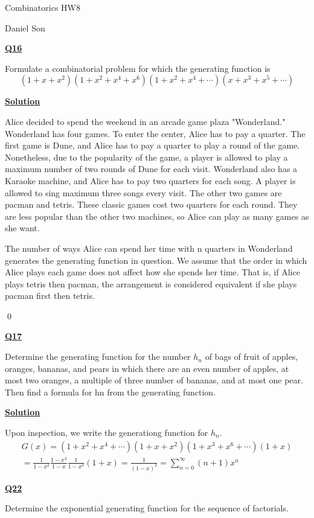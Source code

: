 \documentclass{article}
\newcommand{\new}[1]{
    \vspace{2mm}
    \noindent
    \textbf{
    \underline{#1}}
}
\begin{document}
\begin{center}
\LARGE
Combinatorics HW8

\Large
Daniel Son
\end{center}

\normalsize 

\new{Q16}
Formulate a combinatorial problem for which the generating function is 
\[
    (1 + x + x^2)(1 + x^2 + x^4 + x^6) 
    (1 + x^2 + x^4 + \cdots) (x + x^3 + x^5 + \cdots)
\]
\new{Solution} 
Alice decided to spend the weekend in an arcade game plaza "Wonderland."
Wonderland has four games. To enter the center, Alice has to pay 
a quarter. The first game is Dune, and Alice 
has to pay a quarter to play a round of the game. Nonetheless, 
due to the popularity of the game, a player is allowed to play 
a maximum number of two rounds of Dune for each visit. Wonderland 
also has a Karaoke machine, and Alice has to pay two quarters 
for each song. A player is allowed to sing maximum three songs 
every visit. The other two games are pacman and tetris. These classic 
games cost two quarters for each round. They are less popular than 
the other two machines, so Alice can play as many games as she want. 

The number of ways Alice can spend her time with n quarters in 
Wonderland generates the generating function in question. We assume 
that the order in which Alice plays each game does not affect 
how she spends her time. That is, if Alice plays tetris then pacman, 
the arrangement is considered equivalent if she plays pacman first 
then tetris.

\hfill \qed

\new{Q17}
Determine the generating function for the number $h_n$ of bags of fruit of apples, 
oranges, bananas, and pears in which there are an even number of apples, at 
most two oranges, a multiple of three number of bananas, and at most one pear. 
Then find a formula for hn from the generating function. 

\new{Solution}
Upon inspection, we write the generationg function for $h_n$. 
\[
    \begin{split}
    G(x) = (1 + x^2 + x^4 + \cdots) (1 + x + x^2) 
    (1 + x^3 + x^6 + \cdots) (1 + x)
    \\
    = 
    \frac 1 {1- x^2 }
    \frac {1- x^3} {1 -x}
    \frac 1 {1 - x^3}
    (1 + x) 
    = 
    \frac 1 {(1-x)^2}
    =
    \sum_{n = 0}^\infty (n + 1) x^n
    \end{split}
\]

\new{Q22}
Determine the exponential generating function for the sequence of factorials. 
\end{document}
